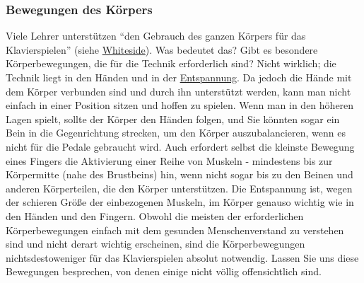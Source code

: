 
\subsubsection{Bewegungen des Körpers}
\label{c1iii4c}

Viele Lehrer unterstützen \enquote{den Gebrauch des ganzen Körpers für das Klavierspielen} (siehe \hyperref[Whiteside]{Whiteside}).
Was bedeutet das?
Gibt es besondere Körperbewegungen, die für die Technik erforderlich sind?
Nicht wirklich; die Technik liegt in den Händen und in der \hyperref[c1ii14]{Entspannung}.
Da jedoch die Hände mit dem Körper verbunden sind und durch ihn unterstützt werden, kann man nicht einfach in einer Position sitzen und hoffen zu spielen.
Wenn man in den höheren Lagen spielt, sollte der Körper den Händen folgen, und Sie könnten sogar ein Bein in die Gegenrichtung strecken, um den Körper auszubalancieren, wenn es nicht für die Pedale gebraucht wird.
Auch erfordert selbst die kleinste Bewegung eines Fingers die Aktivierung einer Reihe von Muskeln - mindestens bis zur Körpermitte (nahe des Brustbeins) hin, wenn nicht sogar bis zu den Beinen und anderen Körperteilen, die den Körper unterstützen.
Die Entspannung ist, wegen der schieren Größe der einbezogenen Muskeln, im Körper genauso wichtig wie in den Händen und den Fingern.
Obwohl die meisten der erforderlichen Körperbewegungen einfach mit dem gesunden Menschenverstand zu verstehen sind und nicht derart wichtig erscheinen, sind die Körperbewegungen nichtsdestoweniger für das Klavierspielen absolut notwendig.
Lassen Sie uns diese Bewegungen besprechen, von denen einige nicht völlig offensichtlich sind.

